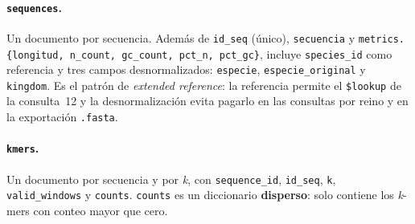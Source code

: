 \documentclass[journal]{IEEEtran}
\begin{document}
\paragraph*{\texttt{sequences}.}
Un documento por secuencia. Además de \texttt{id\_seq} (único), \texttt{secuencia} y
\texttt{metrics.\{longitud, n\_count, gc\_count, pct\_n, pct\_gc\}}, incluye \texttt{species\_id} como
referencia y tres campos desnormalizados: \texttt{especie}, \texttt{especie\_original} y
\texttt{kingdom}. Es el patrón de \textit{extended reference}: la referencia permite el
\texttt{\$lookup} de la consulta~12 y la desnormalización evita pagarlo en las consultas
por reino y en la exportación \texttt{.fasta}.

\paragraph*{\texttt{kmers}.}
Un documento por secuencia y por \textit{k}, con \texttt{sequence\_id}, \texttt{id\_seq},
\texttt{k}, \texttt{valid\_windows} y \texttt{counts}. \texttt{counts} es un diccionario
\textbf{disperso}: solo contiene los \textit{k}-mers con conteo mayor que cero.
\end{document}
